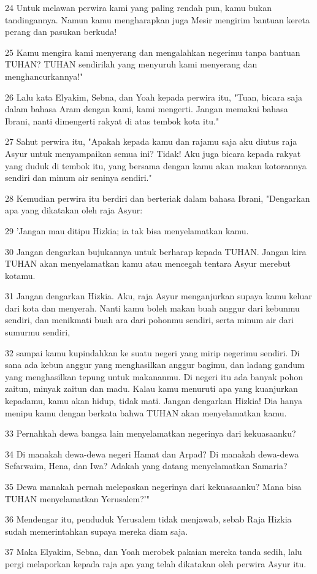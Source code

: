\par 24 Untuk melawan perwira kami yang paling rendah pun, kamu bukan tandingannya. Namun kamu mengharapkan juga Mesir mengirim bantuan kereta perang dan pasukan berkuda!
\par 25 Kamu mengira kami menyerang dan mengalahkan negerimu tanpa bantuan TUHAN? TUHAN sendirilah yang menyuruh kami menyerang dan menghancurkannya!"
\par 26 Lalu kata Elyakim, Sebna, dan Yoah kepada perwira itu, "Tuan, bicara saja dalam bahasa Aram dengan kami, kami mengerti. Jangan memakai bahasa Ibrani, nanti dimengerti rakyat di atas tembok kota itu."
\par 27 Sahut perwira itu, "Apakah kepada kamu dan rajamu saja aku diutus raja Asyur untuk menyampaikan semua ini? Tidak! Aku juga bicara kepada rakyat yang duduk di tembok itu, yang bersama dengan kamu akan makan kotorannya sendiri dan minum air seninya sendiri."
\par 28 Kemudian perwira itu berdiri dan berteriak dalam bahasa Ibrani, "Dengarkan apa yang dikatakan oleh raja Asyur:
\par 29 'Jangan mau ditipu Hizkia; ia tak bisa menyelamatkan kamu.
\par 30 Jangan dengarkan bujukannya untuk berharap kepada TUHAN. Jangan kira TUHAN akan menyelamatkan kamu atau mencegah tentara Asyur merebut kotamu.
\par 31 Jangan dengarkan Hizkia. Aku, raja Asyur menganjurkan supaya kamu keluar dari kota dan menyerah. Nanti kamu boleh makan buah anggur dari kebunmu sendiri, dan menikmati buah ara dari pohonmu sendiri, serta minum air dari sumurmu sendiri,
\par 32 sampai kamu kupindahkan ke suatu negeri yang mirip negerimu sendiri. Di sana ada kebun anggur yang menghasilkan anggur bagimu, dan ladang gandum yang menghasilkan tepung untuk makananmu. Di negeri itu ada banyak pohon zaitun, minyak zaitun dan madu. Kalau kamu menuruti apa yang kuanjurkan kepadamu, kamu akan hidup, tidak mati. Jangan dengarkan Hizkia! Dia hanya menipu kamu dengan berkata bahwa TUHAN akan menyelamatkan kamu.
\par 33 Pernahkah dewa bangsa lain menyelamatkan negerinya dari kekuasaanku?
\par 34 Di manakah dewa-dewa negeri Hamat dan Arpad? Di manakah dewa-dewa Sefarwaim, Hena, dan Iwa? Adakah yang datang menyelamatkan Samaria?
\par 35 Dewa manakah pernah melepaskan negerinya dari kekuasaanku? Mana bisa TUHAN menyelamatkan Yerusalem?'"
\par 36 Mendengar itu, penduduk Yerusalem tidak menjawab, sebab Raja Hizkia sudah memerintahkan supaya mereka diam saja.
\par 37 Maka Elyakim, Sebna, dan Yoah merobek pakaian mereka tanda sedih, lalu pergi melaporkan kepada raja apa yang telah dikatakan oleh perwira Asyur itu.

